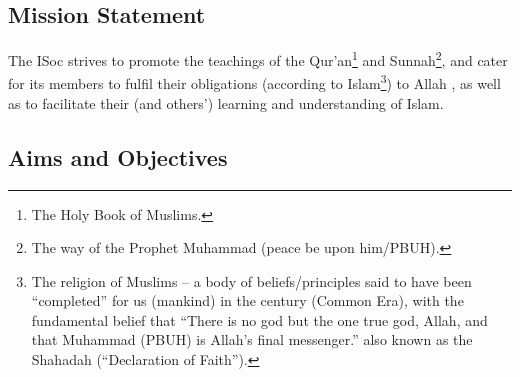 \documentclass[12pt]{article}
\begin{document}
\subsection{Mission Statement}
The ISoc strives to promote the teachings of the Qur'an\footnote{The Holy Book of Muslims.} and Sunnah\footnote{The way of the Prophet Muhammad (peace be upon him/PBUH).}, and cater for its members to fulfil their obligations (according to Islam\footnote{The religion of Muslims -- a body of beliefs/principles said to have been ``completed'' for us (mankind) in the  century (Common Era), with the fundamental belief that ``There is no god but the one true god, Allah, and that Muhammad (PBUH) is Allah's final messenger.'' also known as the Shahadah (``Declaration of Faith'').}) to Allah , as well as to facilitate their (and others') learning and understanding of Islam.

\subsection{Aims and Objectives}
\end{document}
